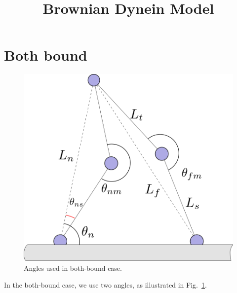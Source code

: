 \documentclass[11pt,twocolumn]{article}
\title{Brownian Dynein Model}
\begin{document}
\maketitle

\section{Both bound}

\begin{figure}
  \includegraphics[width=\columnwidth]{../figures/code-bothbound.png}
  \caption{Angles used in both-bound case.}\label{fig:bothbound}
\end{figure}

In the both-bound case, we use two angles, as illustrated in
Fig.~\ref{fig:bothbound}.
\end{document}
